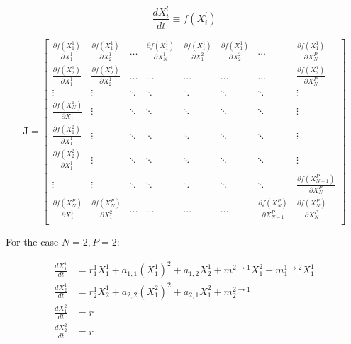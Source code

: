 \documentclass[12pt]{article}
\begin{document}
\[ \frac{dX_{i}^{l}}{dt} \equiv f(X_{i}^{l}) \]

\[ \mathbf{J} = \begin{bmatrix}
    \frac{\partial f(X_1^1)}{\partial X_1^1} & \frac{\partial f(X_1^1)}{\partial X_2^1} & \dots & \frac{\partial f(X_1^1)}{\partial X_N^1}  &  \frac{\partial f(X_1^1)}{\partial X_1^2} & \frac{\partial f(X_1^1)}{\partial X_2^2} & \dots & \frac{\partial f(X_1^1)}{\partial X_N^{P}} \\
    
    \frac{\partial f(X_2^1)}{\partial X_1^1} &  \frac{\partial f(X_2^1)}{\partial X_2^1} & \dots & \dots & \dots & \dots & \dots & \frac{\partial f(X_2^1)}{\partial X_N^P} \\
    \vdots    & \vdots & \ddots  & \ddots & \ddots & \ddots & \ddots & \vdots\\
    \frac{\partial f(X_N^1)}{\partial X_1^1} & \vdots   & \ddots  & \ddots & \ddots & \ddots & \ddots & \vdots \\
    \frac{\partial f(X_1^2)}{\partial X_1^1} & \vdots & \ddots  & \ddots & \ddots & \ddots & \ddots & \vdots \\
    \frac{\partial f(X_2^2)}{\partial X_1^1} & \vdots & \ddots  & \ddots & \ddots & \ddots & \ddots & \vdots\\
    \vdots   & \vdots & \ddots  & \ddots & \ddots & \ddots & \ddots & \frac{\partial f(X_{N-1}^P)}{\partial X_N^P}\\
    \frac{\partial f(X_N^P)}{\partial X_1^1} & \frac{\partial f(X_N^P)}{\partial X_1^2} & \dots & \dots & \dots & \dots & \frac{\partial f(X_N^P)}{\partial X_{N-1}^P} & \frac{\partial f(X_N^P)}{\partial X_N^P} \\
    
\end{bmatrix}\]


For the case $N = 2, P=2$: 

\begin{align*}
\frac{dX_1^1}{dt} &=  r_1^1 X_1^1 + a_{1,1}(X_1^1)^2 +  a_{1,2}X_2^1 + m^{2\rightarrow 1} X_1^2 - m_1^{1\rightarrow 2} X_1^1\\
\frac{dX_2^1}{dt} &=  r_2^1 X_2^1 + a_{2,2} (X_1^2)^2 + a_{2,1}X_1^2  + m_2^{2\rightarrow 1}\\
\frac{dX_1^2}{dt} &=  r\\
\frac{dX_2^2}{dt} &=  r\\
\end{align*}
\end{document}
